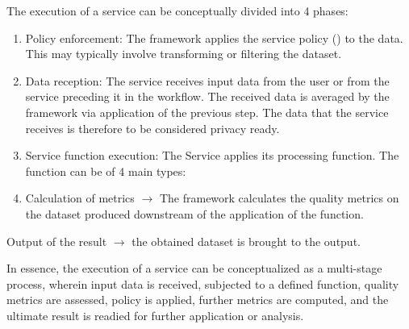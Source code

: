 The execution of a service can be conceptually divided into 4 phases:
\begin{enumerate}
  \item Policy enforcement: The framework applies the service policy ()
        to the data. This may typically involve transforming or filtering the dataset.
  \item Data reception: The service receives input data from the user or from the service preceding it in the workflow. The received data is averaged by the framework via application of the previous step. The data that the service receives is therefore to be considered privacy ready.
  \item Service function execution: The Service applies its processing function. The function can be of 4 main types:
  \item Calculation of metrics $\rightarrow$ The framework calculates the quality metrics on the dataset produced downstream of the application of the function.
\end{enumerate}
Output of the result $\rightarrow$ the obtained dataset is brought to the output.


In essence, the execution of a service can be conceptualized as a multi-stage process, wherein input data is received, subjected to a defined function, quality metrics are assessed, policy is applied, further metrics are computed, and the ultimate result is readied for further application or analysis.


